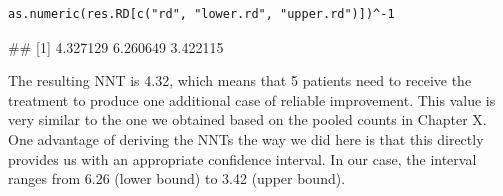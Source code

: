 \begin{lstlisting}
as.numeric(res.RD[c("rd", "lower.rd", "upper.rd")])^-1
\end{lstlisting}

\begin{example}
## [1] 4.327129 6.260649 3.422115
\end{example}

The resulting NNT is 4.32, which means that 5 patients need to receive the treatment to produce one additional case of reliable improvement. This value is very similar to the one we obtained based on the pooled counts in Chapter X. One advantage of deriving the NNTs the way we did here is that this directly provides us with an appropriate confidence interval. In our case, the interval ranges from 6.26 (lower bound) to 3.42 (upper bound).

